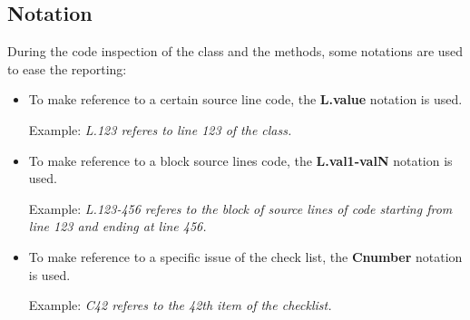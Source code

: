 \subsection{Notation}

During the code inspection of the class and the methods, some notations are used to ease the reporting:

\begin{itemize}
	\item To make reference to a certain source line code, the \textbf{L.value} notation is used. 

Example: \textit{L.123 referes to line 123 of the class.}
	\item To make reference to a block source lines code, the \textbf{L.val1-valN} notation is used. 

Example: \textit{L.123-456 referes to the block of source lines of code starting from line 123 and ending at line 456.}
	\item To make reference to a specific issue of the check list, the \textbf{Cnumber} notation is used.

Example: \textit{C42 referes to the 42th item of the checklist.}
\end{itemize}
